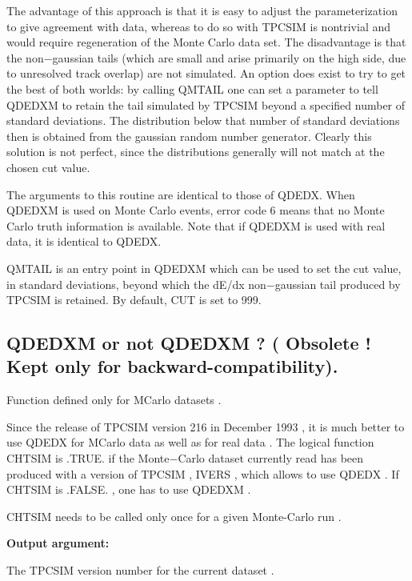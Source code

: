 The advantage of this approach is that it is easy to adjust the
parameterization to give agreement with data, whereas to do so
with TPCSIM is nontrivial and would require regeneration of the
Monte Carlo data set.
The disadvantage is that the non$-$gaussian tails (which are
small and arise primarily on the high side, due to unresolved
track overlap) are not simulated.
An option does exist to try to get the best of both worlds:
by calling QMTAIL one can set a parameter to tell QDEDXM to
retain the tail simulated by TPCSIM beyond a specified number
of standard deviations.
The distribution below that number of standard deviations then
is obtained from the gaussian random number generator.
Clearly this solution
is not perfect, since the distributions
generally will not match at the chosen cut value.
 
The arguments to this routine are identical to those of QDEDX.
When QDEDXM is used on Monte Carlo events, error code 6
means that no Monte
Carlo truth information is available.
Note that if QDEDXM is used with real data, it is identical
to QDEDX.
\par
\noindent{}
\par
QMTAIL is an entry point in QDEDXM which can be used to set the
cut value, in standard deviations, beyond which the dE/dx
non$-$gaussian tail produced by TPCSIM is retained.  By default,
CUT is set to 999.


\subsection{\label{sec-OARDEDC}QDEDXM or not QDEDXM ? ( Obsolete ! Kept only for backward-compatibility).}
\par
{}
\par
Function defined only for MCarlo datasets .
\par
Since the release of TPCSIM version 216 in December 1993 , it is much better
to use QDEDX for MCarlo data as well as for real data . The logical function
CHTSIM is .TRUE. if the Monte$-$Carlo dataset currently read has been produced
with a version of TPCSIM , IVERS , which allows to use QDEDX . If CHTSIM is .FALSE. , one has
to use QDEDXM .
\par
 CHTSIM needs to be called only once for a given Monte-Carlo run .
\par
{\bf Output argument:}
\begin{indentlist}{ 3.50cm}{ 3.75cm}
The TPCSIM version number for the current dataset .
\end{indentlist}
